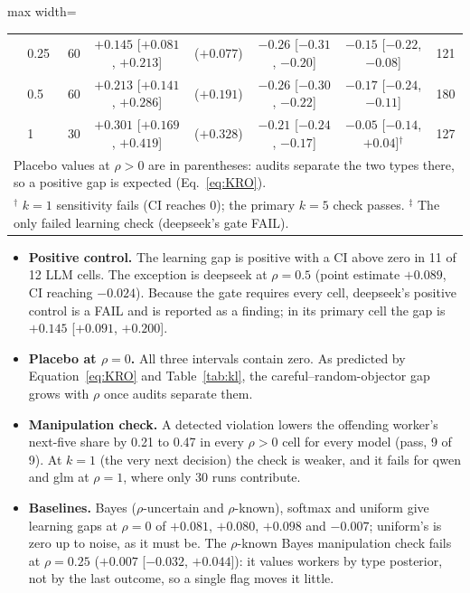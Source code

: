\documentclass[11pt,letterpaper]{article}
\numberwithin{equation}{section}
\numberwithin{table}{section}
\numberwithin{figure}{section}
\numberwithin{algorithm}{section}
\begin{document}
\begin{table}[h]
\begin{adjustbox}{max width=\linewidth}
\begin{tabular}{llrccccc}
 & 0.25 & 60 & $+0.145$ [$+0.081$, $+0.213$] & ($+0.077$) & $-0.26$ [$-0.31$, $-0.20$] & $-0.15$ [$-0.22$, $-0.08$] & 121 \\
 & 0.5 & 60 & $+0.213$ [$+0.141$, $+0.286$] & ($+0.191$) & $-0.26$ [$-0.30$, $-0.22$] & $-0.17$ [$-0.24$, $-0.11$] & 180 \\
 & 1 & 30 & $+0.301$ [$+0.169$, $+0.419$] & ($+0.328$) & $-0.21$ [$-0.24$, $-0.17$] & $-0.05$ [$-0.14$, $+0.04$]$^\dagger$ & 127 \\
\bottomrule
\multicolumn{8}{l}{\scriptsize Placebo values at $\rho>0$ are in parentheses: audits separate the two types there, so a positive gap is expected (Eq.~\ref{eq:KRO}).}\\
\multicolumn{8}{l}{\scriptsize $^\dagger$ $k=1$ sensitivity fails (CI reaches 0); the primary $k=5$ check passes. $^\ddagger$ The only failed learning check (deepseek's gate FAIL).}
\end{tabular}
\end{adjustbox}
\end{table}

\begin{itemize}
  \item \textbf{Positive control.} The learning gap is positive with a CI above zero in 11 of 12 LLM cells. The exception is deepseek at $\rho=0.5$ (point estimate $+0.089$, CI reaching $-0.024$). Because the gate requires every cell, deepseek's positive control is a FAIL and is reported as a finding; in its primary cell the gap is $+0.145$ [$+0.091$, $+0.200$].
  \item \textbf{Placebo at $\rho=0$.} All three intervals contain zero. As predicted by Equation~\eqref{eq:KRO} and Table~\ref{tab:kl}, the careful--random-objector gap grows with $\rho$ once audits separate them.
  \item \textbf{Manipulation check.} A detected violation lowers the offending worker's next-five share by 0.21 to 0.47 in every $\rho>0$ cell for every model (pass, 9 of 9). At $k=1$ (the very next decision) the check is weaker, and it fails for qwen and glm at $\rho=1$, where only 30 runs contribute.
  \item \textbf{Baselines.} Bayes ($\rho$-uncertain and $\rho$-known), softmax and uniform give learning gaps at $\rho=0$ of $+0.081$, $+0.080$, $+0.098$ and $-0.007$; uniform's is zero up to noise, as it must be. The $\rho$-known Bayes manipulation check fails at $\rho=0.25$ ($+0.007$ [$-0.032$, $+0.044$]): it values workers by type posterior, not by the last outcome, so a single flag moves it little.
\end{itemize}
\end{document}
